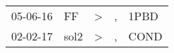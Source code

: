 \begin{supertabular}{lllll}
 05-06-16 &    FF &  \textgreater &  , &  1PBD \\
 02-02-17 &  sol2 &  \textgreater &  , &  COND \\
\end{supertabular}
